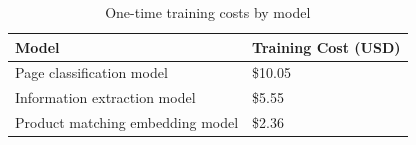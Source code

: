 \begin{table}[H]
    \centering
    \small
    \begin{tabularx}{0.7\textwidth}{X >{\raggedleft\arraybackslash}p{3.2cm}}
        \toprule
        \textbf{Model} & \textbf{Training Cost (USD)} \\
        \midrule
        Page classification model & \$10.05 \\
        Information extraction model & \$5.55 \\
        Product matching embedding model & \$2.36 \\
        \bottomrule
    \end{tabularx}
    \caption{One-time training costs by model}
    \label{tab:one-time-costs}
\end{table}
